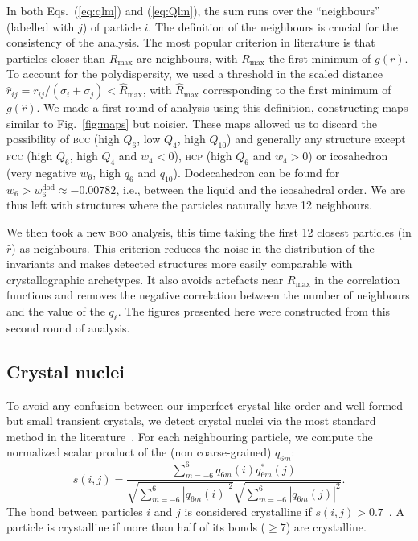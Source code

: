 In both Eqs.~(\ref{eq:qlm}) and (\ref{eq:Qlm}), the sum runs over the ``neighbours'' (labelled with $j$) of particle $i$. The definition of the neighbours is crucial for the consistency of the analysis. The most popular criterion in literature is that particles closer than $R_\text{max}$ are neighbours, with $R_\text{max}$ the first minimum of $g(r)$. To account for the polydispersity, we used a threshold in the scaled distance $\hat{r}_{i j} = r_{i j} /(\sigma_i+\sigma_j) < \hat{R}_\text{max}$, with $\hat{R}_\text{max}$ corresponding to the first minimum of $g(\hat{r})$. We made a first round of analysis using this definition, constructing maps similar to Fig.~\ref{fig:maps} but noisier. These maps allowed us to discard the possibility of \textsc{bcc} (high $Q_6$, low $Q_4$, high $Q_{10}$) and generally any structure except \textsc{fcc} (high $Q_6$, high $Q_4$ and $w_4<0$), \textsc{hcp} (high $Q_6$ and $w_4>0$) or icosahedron (very negative $w_6$, high $q_6$ and $q_{10}$). Dodecahedron can be found for $w_6>w_6^\text{dod}\approx -0.00782$, i.e., between the liquid and the icosahedral order. We are thus left with structures where the particles naturally have 12 neighbours. 

We then took a new \textsc{boo} analysis, this time taking the first 12 closest particles (in $\hat{r}$) as neighbours. This criterion reduces the noise in the distribution of the invariants and makes detected structures more easily comparable with crystallographic archetypes. It also avoids artefacts near $R_\text{max}$ in the correlation functions and removes the negative correlation between the number of neighbours and the value of the $q_\ell$. The figures presented here were constructed from this second round of analysis.

\subsection*{Crystal nuclei}

To avoid any confusion between our imperfect crystal-like order and well-formed but small transient crystals, we detect crystal nuclei via the most standard method in the literature~\cite{ReintenWolde1996, Zaccarelli2009}. For each neighbouring particle, we compute the normalized scalar product of the (non coarse-grained) $q_{6 m}$:
\begin{equation}
	s(i,j) = \frac{
		\sum_{m=-6}^{6} q_{6 m}(i) q_{6 m}^{*}(j)
	}{
		\sqrt{\sum_{m=-6}^{6} |q_{6 m}(i)|^2} \sqrt{\sum_{m=-6}^{6} |q_{6 m}(j)|^2}
	}.
	\label{eq:boo_dot_product}
\end{equation}
The bond between particles $i$ and $j$ is considered crystalline if $s(i,j)>0.7$~\cite{Zaccarelli2009}. A particle is crystalline if more than half of its bonds ($\geq 7$) are crystalline.

